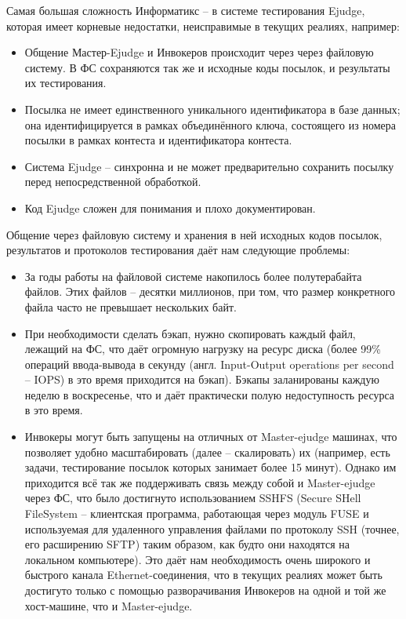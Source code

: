 Самая большая сложность Информатикс -- в системе тестирования Ejudge, которая имеет корневые недостатки, неисправимые в текущих реалиях, например:
\begin{itemize}
    \item Общение Мастер-Ejudge и Инвокеров происходит через через файловую систему\cite{ejudge_jobs}. 
    В ФС сохраняются так же и исходные коды посылок, и результаты их тестирования.
    \item Посылка не имеет единственного уникального идентификатора в базе данных; она идентифицируется в рамках объединённого ключа, состоящего из номера посылки в рамках контеста и идентификатора контеста.
    \item Система Ejudge -- синхронна и не может предварительно сохранить посылку перед непосредственной обработкой.
    \item Код Ejudge сложен для понимания и плохо документирован\cite{ejudge_source}.
\end{itemize}

Общение через файловую систему и хранения в ней исходных кодов посылок, результатов и протоколов тестирования даёт нам следующие проблемы:

\begin{itemize}
    \item За годы работы на файловой системе накопилось более полутерабайта файлов.
Этих файлов -- десятки миллионов, при том, что размер конкретного файла часто не превышает нескольких байт.
    \item При необходимости сделать бэкап, нужно скопировать каждый файл, лежащий на ФС, что даёт огромную нагрузку на ресурс диска
(более 99\% операций ввода-вывода в секунду (англ. Input-Output operations per second -- IOPS) в это время приходится на бэкап). 
Бэкапы заланированы каждую неделю в воскресенье, что и даёт практически полую недоступность ресурса в это время.
    \item Инвокеры могут быть запущены на отличных от Master-ejudge машинах, что позволяет удобно масштабировать (далее -- скалировать) их (например, есть задачи, тестирование посылок которых занимает более 15 минут). 
    Однако им приходится всё так же поддерживать связь между собой и Master-ejudge через ФС, 
    что было достигнуто использованием SSHFS (Secure SHell FileSystem -- клиентская программа, работающая через модуль FUSE и используемая для удаленного управления файлами по протоколу SSH (точнее, его расширению SFTP) таким образом, как будто они находятся на локальном компьютере).
    Это даёт нам необходимость очень широкого и быстрого канала Ethernet-соединения, что в текущих реалиях может быть достигуто только с помощью разворачивания Инвокеров на одной и той же хост-машине, что и Master-ejudge.

\end{itemize}


